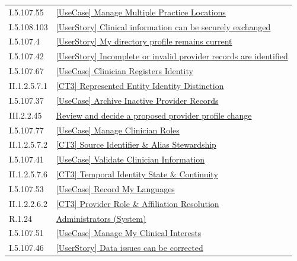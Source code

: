 \begin{longtable}{p{.22\linewidth}p{.73\linewidth}}
I.5.107.55 & \hyperref[element:ca590c187c4b4887af0d8eb9036fc763]{[UseCase] Manage Multiple Practice Locations} \\
I.5.108.103 & \hyperref[element:cd2b20efc3a242f7bc481d2d177f06d0]{[UserStory] Clinical information can be securely exchanged} \\
I.5.107.4 & \hyperref[element:cdff7cb139a84c739754be0c95dcb5c3]{[UserStory] My directory profile remains current} \\
I.5.107.42 & \hyperref[element:cf9cadd273984105bf59fadb5c98ab38]{[UserStory] Incomplete or invalid provider records are identified} \\
I.5.107.67 & \hyperref[element:d347233f6f1b497c85bff42f712b6442]{[UseCase] Clinician Registers Identity} \\
II.1.2.5.7.1 & \hyperref[element:d403533b88f243d0aa555a3a7566b5d1]{[CT3] Represented Entity Identity Distinction} \\
I.5.107.37 & \hyperref[element:d585396235e7455d8a4503d566d62bfb]{[UseCase] Archive Inactive Provider Records} \\
III.2.2.45 & \hyperref[element:d8e20e81429945caa1508b50956475b5]{Review and decide a proposed provider profile change} \\
I.5.107.77 & \hyperref[element:d924111690ab4e589a3609e17854be37]{[UseCase] Manage Clinician Roles} \\
II.1.2.5.7.2 & \hyperref[element:d928bd4033a84a5e9fde8ec88e31bbd6]{[CT3] Source Identifier \& Alias Stewardship} \\
I.5.107.41 & \hyperref[element:da32abda78014a32a93cb9032994f4fa]{[UseCase] Validate Clinician Information} \\
II.1.2.5.7.6 & \hyperref[element:dae537d7b2f94d1596036ba891cab10d]{[CT3] Temporal Identity State \& Continuity} \\
I.5.107.53 & \hyperref[element:dcd12df607ff413facbf69371db60edf]{[UseCase] Record My Languages} \\
II.1.2.2.6.2 & \hyperref[element:dd0d16f6e6b9491c85deea915bb7bf4d]{[CT3] Provider Role \& Affiliation Resolution} \\
R.1.24 & \hyperref[element:ddeedc03593c4d658f6aa053d13767c5]{Administrators (System)} \\
I.5.107.51 & \hyperref[element:dfbb4106d6b745519135a32db3d2a0cb]{[UseCase] Manage My Clinical Interests} \\
I.5.107.46 & \hyperref[element:dfe22d3d70704a99ab802f0aa1599aaa]{[UserStory] Data issues can be corrected} \\

\end{longtable}
